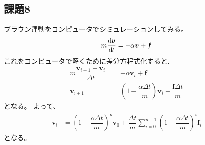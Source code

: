 \subsection{課題8}
ブラウン運動をコンピュータでシミュレーションしてみる。
\begin{equation}\label{eq:brownian-motion-diff-eq}
    m \odv{\bm{v}}{t} = -\alpha \bm{v} + \bm{f}
\end{equation}
これをコンピュータで解くために差分方程式化すると、
\begin{align}\label{eq:brownian-motion-diff-eq-diff}
    m \dfrac{\bm{v}_{i+1} - \bm{v}_i}{\Delta t} & = -\alpha \bm{v}_i + \bm{f} \nonumber                                                 \\
    \bm{v}_{i+1}                                & = \left( 1 - \dfrac{\alpha \Delta t}{m} \right) \bm{v}_i + \dfrac{\bm{f} \Delta t}{m}
\end{align}
となる。
よって、
\begin{align}\label{eq:brownian-motion-diff-eq-diff-sum}
    \bm{v}_{i} & = \left(1 - \dfrac{\alpha \Delta t}{m}\right)^n \bm{v}_0 + \dfrac{\Delta t}{m} \sum_{i=0}^{n-1} \left(1 - \dfrac{\alpha \Delta t}{m}\right)^i \bm{f}_i
\end{align}
となる。


